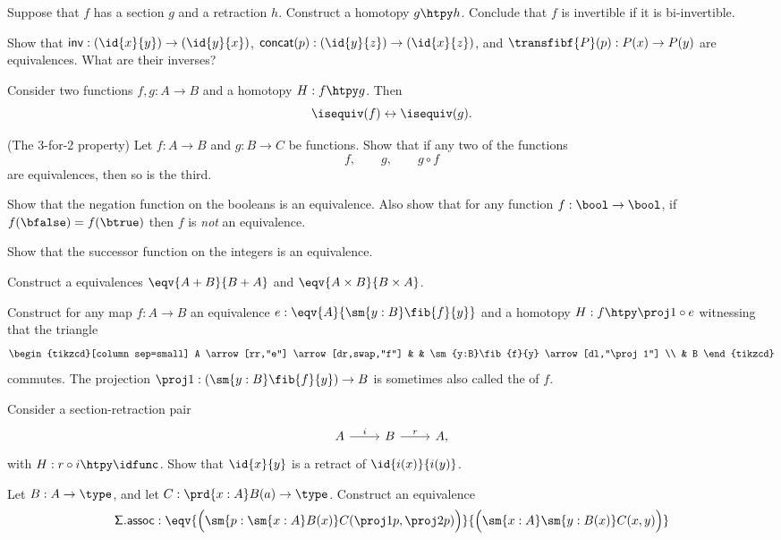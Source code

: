 \begin{exercises}
\item Suppose that $f$ has a section $g$ and a retraction $h$. Construct a homotopy $g\htpy h$. Conclude that $f$ is invertible if it is bi-invertible.
\item Show that $\mathsf{inv}:(\id{x}{y})\to(\id{y}{x})$, $\mathsf{concat}(p):(\id{y}{z})\to(\id{x}{z})$, and $\transfibf{P}(p):P(x)\to P(y)$ are equivalences. What are their inverses?
\item \label{ex:htpy_equiv} Consider two functions $f,g:A\to B$ and a homotopy $H:f\htpy g$. Then
\begin{equation*}
\isequiv(f)\leftrightarrow\isequiv(g).
\end{equation*}
\item \label{ex:3_for_2} (The 3-for-2 property) Let $f:A\to B$ and $g:B\to C$ be functions. Show that if any two of the functions
\begin{equation*}
f,\qquad g,\qquad g\circ f
\end{equation*}
are equivalences, then so is the third.
\item \label{ex:neg_equiv} Show that the negation function on the booleans is an equivalence. Also show that for any function $f:\bool\to\bool$, if $f(\bfalse)=f(\btrue)$ then $f$ is \emph{not} an equivalence.
\item \label{ex:succ_equiv} Show that the successor function on the integers is an equivalence.
\item Construct a equivalences $\eqv{A+B}{B+A}$ and $\eqv{A\times B}{B\times A}$.
\item Construct for any map $f:A\to B$ an equivalence $e:\eqv{A}{\sm{y:B}\fib{f}{y}}$ and a homotopy $H:f\htpy \proj 1\circ e$ witnessing that the triangle
\begin{equation*}
\begin{tikzcd}[column sep=small]
A \arrow[rr,"e"] \arrow[dr,swap,"f"] & & \sm{y:B}\fib{f}{y} \arrow[dl,"\proj 1"] \\
& B
\end{tikzcd}
\end{equation*}
commutes. The projection $\proj 1 : (\sm{y:B}\fib{f}{y})\to B$ is sometimes also called the  of $f$.
\item \label{ex:retr_id} Consider a section-retraction pair
\begin{equation*}
\begin{tikzcd}
A \arrow[r,"i"] & B \arrow[r,"r"] & A,
\end{tikzcd}
\end{equation*}
with $H:r\circ i\htpy \idfunc$. Show that $\id{x}{y}$ is a retract of $\id{i(x)}{i(y)}$.
\item Let $B:A\to \type$, and let $C:\prd{x:A}B(a)\to\type$. Construct an equivalence
\begin{equation*}
\mathsf{\Sigma.assoc}:\eqv{\Big(\sm{p:\sm{x:A}B(x)}C(\proj 1 p,\proj 2 p)\Big)}{\Big(\sm{x:A}\sm{y:B(x)}C(x,y)\Big)}
\end{equation*}
\end{exercises}

